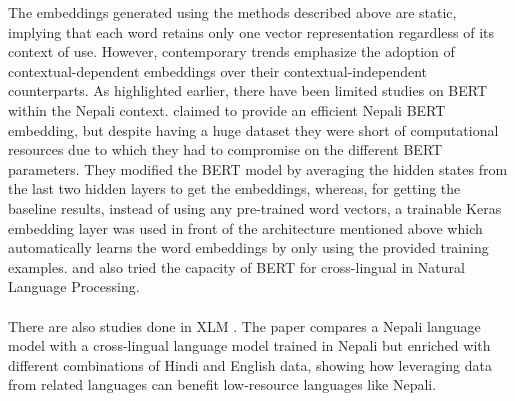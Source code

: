 The embeddings generated using the methods described above are static, implying that each word retains only one vector representation regardless of its context of use. However, contemporary trends emphasize the adoption of contextual-dependent embeddings over their contextual-independent counterparts. As highlighted earlier, there have been limited studies on BERT within the Nepali context. \cite{koirala-niraula-2021-npvec1} claimed to provide an efficient Nepali BERT embedding, but despite having a huge dataset they were short of computational resources due to which they had to compromise on the different BERT parameters. They modified the BERT model by averaging the hidden states from the last two hidden layers to get the embeddings, whereas, for getting the baseline results, instead of using any pre-trained word vectors, a trainable Keras embedding layer was used in front of the architecture mentioned above which automatically learns the word embeddings by only using the provided training examples. \cite{rajan_nepalibert_2021} and  \cite{milanmg_bert-nepali_2022} also tried the capacity of BERT for cross-lingual in Natural Language Processing. \\\\
There are also studies done in XLM \cite{NEURIPS2019_c04c19c2}. The paper compares a Nepali language model with a cross-lingual language model trained in Nepali but enriched with different combinations of Hindi and English data, showing how leveraging data from related languages can benefit low-resource languages like Nepali.
